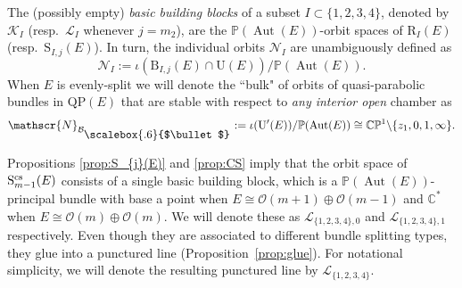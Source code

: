 \documentclass[pdftex]{sigma}
\newcommand{\field}[1]{\ensuremath{\mathbb{#1}}}
\newcommand{\CC}{\field{C}}
\newcommand{\PP}{\field{P}}
\newcommand{\calO}{\mathcal{O}}
\newcommand\sbul[1][.6]{\mathbin{\vcenter{\hbox{\scalebox{#1}{$\bullet$}}}}}
\newcommand{\curly}[1]{\mathscr{#1}}
\newcommand{\cK}{\curly{K}}
\newcommand{\cL}{\curly{L}}
\newcommand{\cN}{\curly{N}}
\newcommand{\qB}{\mathcal{B}}
\DeclareMathOperator{\Aut}{Aut}
\numberwithin{equation}{section}
\begin{document}
\begin{Definition}\label{def:b-b-b}
The (possibly empty) \textit{basic building blocks} of a subset $I\subset\{1,2,3,4\}$, denoted by $\cK_{I}$ (resp.~$\cL_{I}$ whenever $j=m_{2}$), are the $\PP(\Aut(E))$-orbit spaces of $\mathrm{R}_{I}(E)$ (resp.~$\mathrm{S}_{I,j}(E)$). In turn, the individual orbits $\cN_{I}$ are unambiguously defined as
\[
\cN_{I}:=\iota(\mathrm{B}_{I,j}(E)\cap \mathrm{U}(E))/\PP(\Aut(E)).
\]
When $E$ is evenly-split we will denote the ``bulk" of orbits of quasi-parabolic bundles in $\mathrm{QP}(E)$ that are stable with respect to \textit{any interior open} chamber as
\[
\cN_{\qB_{\sbul}}:= \iota(\mathrm{U}'(E))/\PP(\Aut(E))\cong\CC\PP^{1}\backslash\{z_{1},0,1,\infty\}.
\]
\end{Definition}

Propositions \ref{prop:S_{j}(E)} and \ref{prop:CS} imply that the orbit space of $\mathrm{S}^{\rm cs}_{m-1}(E)$ consists of a single basic building block, which is a $\PP(\Aut(E))$-principal bundle with base a point when $E\cong \calO(m+1)\oplus\calO(m-1)$ and $\CC^{*}$ when $E\cong\calO(m)\oplus\calO(m)$. We will denote these as $\cL_{\{1,2,3,4\},0}$ and $\cL_{\{1,2,3,4\},1}$ respectively. Even though they are associated to different bundle splitting types, they glue into a punctured line (Proposition~\ref{prop:glue}). For notational simplicity, we will denote the resulting punctured line by $\cL_{\{1,2,3,4\}}$.
\end{document}
